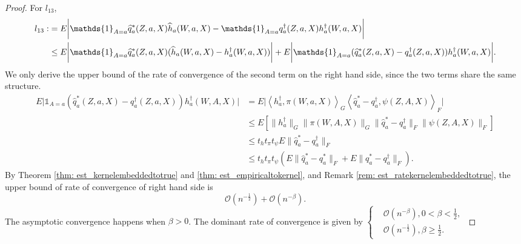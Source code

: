 \begin{proof}
    For $l_{13}$, 
    \begin{align}
        \label{eq: est_l13bound1}
        l_{13}:&= E\bigg|\mathds{1}_{A=a}\widehat{q}^*_a(Z,a,X)\widehat{h}_a(W,a,X)-\mathds{1}_{A=a}q_a^{\dagger}(Z,a,X)h_a^{\dagger}(W,a,X)\bigg| \notag\\
               &\leq E\bigg|\mathds{1}_{A=a}\widehat{q}^*_a(Z,a,X)(\widehat{h}_a(W,a,X)-h_a^{\dagger}(W,a,X))\bigg| + E\bigg|\mathds{1}_{A=a}(\widehat{q}^*_a(Z,a,X)-q_a^{\dagger}(Z,a,X))h_a^{\dagger}(W,a,X)\bigg|.
    \end{align}
    We only derive the upper bound of the rate of convergence of the second term on the right hand side, 
    since the two terms share the same structure. 
    \begin{align*}
        E\bigg|\mathds{1}_{A=a}(\widehat{q}^*_a(Z,a,X)-q_a^{\dagger}(Z,a,X))h_a^{\dagger}(W,A,X)\bigg| &= E\bigg|\left\langle h_a^{\dagger}, \pi(W,a,X)\right\rangle_G\left\langle \widehat{q}^*_a-q_a^{\dagger}, \psi(Z,A,X)\right\rangle_F\bigg| \\
                &\leq E[\|h_a^{\dagger}\|_G\|\pi(W,A,X)\|_G\|\widehat{q}^*_a-q_a^{\dagger}\|_F\|\psi(Z,A,X)\|_F] \\
                &\leq t_ht_{\pi}t_{\psi}E\|\widehat{q}^*_a-q_a^{\dagger}\|_F \\
                &\leq t_ht_{\pi}t_{\psi}(E\|\widehat{q}^*_a-q^*_a\|_F+E\|q^*_a-q_a^{\dagger}\|_F).
    \end{align*}
    By Theorem \ref{thm: est_kernelembeddedtotrue} and \ref{thm: est_empiricaltokernel}, and Remark \ref{rem: est_ratekernelembeddedtotrue}, 
    the upper bound of rate of convergence of right hand side is 
    \begin{equation*}
        \mathcal{O}(n^{-\frac{1}{2}}) + \mathcal{O}(n^{-\beta}). 
    \end{equation*}
    The asymptotic convergence happens when $\beta>0$. 
    The dominant rate of convergence is given by $\left\{\begin{aligned}
        & \mathcal{O}(n^{-\beta}), 0<\beta<\frac{1}{2}, \\
        & \mathcal{O}(n^{-\frac{1}{2}}), \beta\geq \frac{1}{2}.
    \end{aligned}\right.$


\end{proof}
